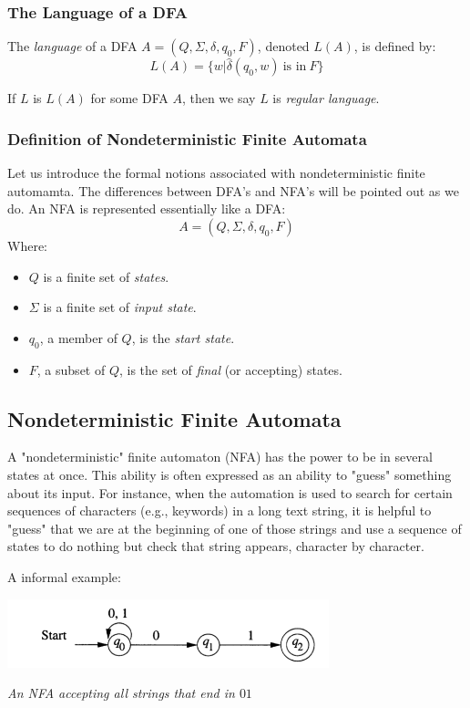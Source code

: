 \documentclass[12pt,reqno]{amsart}
\begin{document}
\subsubsection{The Language of a DFA}
The \textit{language} of a DFA $A = (Q, \Sigma, \delta, q_0, F)$, denoted $L(A)$, is defined by:
$$
	L(A) = \{w | \hat{\delta}(q_0,w) ~\text{is in}~ F \}
$$

If $L$ is $L(A)$ for some DFA $A$, then we say $L$ is \textit{regular language}.

\subsubsection{Definition of Nondeterministic Finite Automata}
Let us introduce the formal notions associated with nondeterministic finite automamta. The differences between DFA's and NFA's will be pointed out as we do. An NFA is represented essentially like a DFA:
$$
	A = ( Q, \Sigma, \delta, q_0, F )
$$
Where:
\begin{itemize}
	\item $Q$ is a finite set of \textit{states}.
	\item $\Sigma$ is a finite set of \textit{input state}.
	\item $q_0$, a member of $Q$, is the \textit{start state}.
	\item $F$, a subset of $Q$, is the set of \textit{final} (or accepting) states.
\end{itemize}
 



\subsection{Nondeterministic Finite Automata}
A "nondeterministic" finite automaton (NFA) has the power to be in several states at once. This ability is often expressed as an ability to "guess" something about its input. For instance, when the automation is used to search for certain sequences of characters (e.g., keywords) in a long text string, it is helpful to "guess" that we are at the beginning of one of those strings and use a sequence of states to do nothing but check that string appears, character by character.

A informal example:

\begin{center}
	\includegraphics[width=0.7\textwidth]{NFA}
	
	\textit{An NFA accepting all strings that end in $01$}
\end{center}
\end{document}

